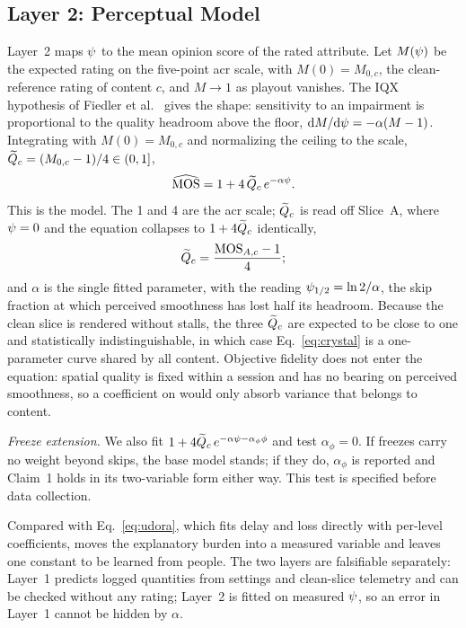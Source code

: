 \subsection{Layer 2: Perceptual Model}
\label{sec:model-layer2}

Layer~2 maps $\psi$ to the mean opinion score of the rated attribute.
Let $M(\psi)$ be the expected rating on the five-point \gls{acr}
scale, with $M(0) = M_{0,c}$, the clean-reference rating of content
$c$, and $M \to 1$ as playout vanishes. The IQX hypothesis of Fiedler
et al.~\cite{fiedler2010} gives the shape: sensitivity to an
impairment is proportional to the quality headroom above the floor,
$\mathrm{d}M/\mathrm{d}\psi = -\alpha (M - 1)$. Integrating with
$M(0) = M_{0,c}$ and normalizing the ceiling to the scale,
$\widetilde{Q}_c = (M_{0,c} - 1)/4 \in (0, 1]$,
\begin{equation}
  \widehat{\mathrm{MOS}} = 1 + 4\,\widetilde{Q}_c\, e^{-\alpha \psi}.
  \label{eq:crystal}
\end{equation}
This is the \crystal model. The 1 and 4 are the \gls{acr} scale; $\widetilde{Q}_c$
is read off Slice~A, where $\psi = 0$ and the equation collapses to
$1 + 4\widetilde{Q}_c$ identically,
\begin{equation}
  \widetilde{Q}_c = \frac{\mathrm{MOS}_{A,c} - 1}{4};
  \label{eq:ceiling}
\end{equation}
and $\alpha$ is the single fitted parameter, with the reading
$\psi_{1/2} = \ln 2/\alpha$, the skip fraction at which perceived
smoothness has lost half its headroom. Because the clean slice is
rendered without stalls, the three $\widetilde{Q}_c$ are expected to be close to
one and statistically indistinguishable, in which case
Eq.~\eqref{eq:crystal} is a one-parameter curve shared by all content.
Objective fidelity does not enter the equation: spatial quality is
fixed within a session and has no bearing on perceived smoothness, so
a coefficient on \pcqm would only absorb variance that belongs to
content.

\emph{Freeze extension.} We also fit
$1 + 4\widetilde{Q}_c\,e^{-\alpha\psi - \alpha_\phi \phi}$ and test
$\alpha_\phi = 0$. If freezes carry no weight beyond skips, the base
model stands; if they do, $\alpha_\phi$ is reported and Claim~1 holds
in its two-variable form either way. This test is specified before
data collection.

Compared with Eq.~\eqref{eq:udora}, which fits delay and loss directly
with per-level coefficients, \crystal moves the explanatory burden into
a measured variable and leaves one constant to be learned from people.
The two layers are falsifiable separately: Layer~1 predicts logged
quantities from settings and clean-slice telemetry and can be checked
without any rating; Layer~2 is fitted on measured $\psi$, so an error
in Layer~1 cannot be hidden by $\alpha$.

